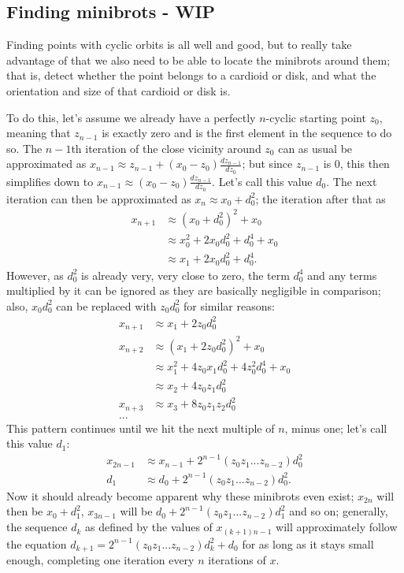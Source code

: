 \documentclass[12pt,a4paper]{article}
\begin{document}
\subsection{Finding minibrots - WIP}

Finding points with cyclic orbits is all well and good, but to really take advantage of that we also need to be able to locate the minibrots around them; that is, detect whether the point belongs to a cardioid or disk, and what the orientation and size of that cardioid or disk is.

To do this, let's assume we already have a perfectly $n$-cyclic starting point $z_0$, meaning that $z_{n-1}$ is exactly zero and is the first element in the sequence to do so. The $n-1$th iteration of the close vicinity around $z_0$ can as usual be approximated as $x_{n-1}\approx z_{n-1}+(x_0-z_0)\frac{dz_{n-1}}{dz_0}$; but since $z_{n-1}$ is $0$, this then simplifies down to $x_{n-1}\approx(x_0-z_0)\frac{dz_{n-1}}{dz_0}$. Let's call this value $d_0$. The next iteration can then be approximated as $x_{n}\approx x_0+d_0^2$; the iteration after that as
\begin{align*}
	x_{n+1} &\approx (x_0+d_0^2)^2+x_0\\
	&\approx x_0^2+2x_0d_0^2+d_0^4+x_0\\
	&\approx x_1+2x_0d_0^2+d_0^4.
\end{align*}
However, as $d_0^2$ is already very, very close to zero, the term $d_0^4$ and any terms multiplied by it can be ignored as they are basically negligible in comparison; also, $x_0d_0^2$ can be replaced with $z_0d_0^2$ for similar reasons:
\begin{align*}
	x_{n+1} &\approx x_1+2z_0d_0^2\\
	x_{n+2} &\approx (x_1+2z_0d_0^2)^2+x_0\\
	&\approx x_1^2+4z_0x_1d_0^2+4z_0^2d_0^4+x_0\\
	&\approx x_2+4z_0z_1d_0^2\\
	x_{n+3} &\approx x_3+8z_0z_1z_2d_0^2\\
	...
\end{align*}
This pattern continues until we hit the next multiple of $n$, minus one; let's call this value $d_1$:
\begin{align*}
	x_{2n-1} &\approx x_{n-1}+2^{n-1}(z_0z_1...z_{n-2})d_0^2\\
	d_1 &\approx d_0+2^{n-1}(z_0z_1...z_{n-2})d_0^2.
\end{align*}
Now it should already become apparent why these minibrots even exist; $x_{2n}$ will then be $x_0+d_1^2$, $x_{3n-1}$ will be $d_0+2^{n-1}(z_0z_1...z_{n-2})d_1^2$ and so on; generally, the sequence $d_k$ as defined by the values of $x_{(k+1)n-1}$ will approximately follow the equation $d_{k+1}=2^{n-1}(z_0z_1...z_{n-2})d_k^2+d_0$ for as long as it stays small enough, completing one iteration every $n$ iterations of $x$.
\end{document}
